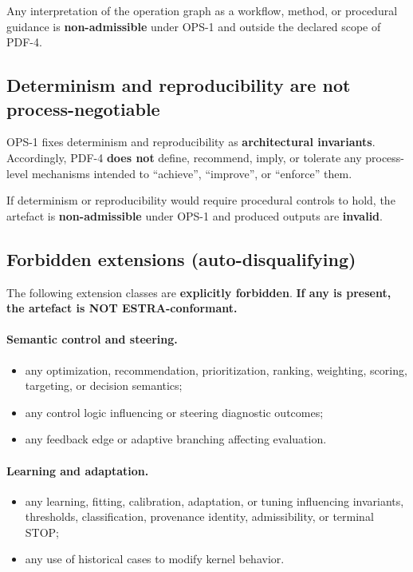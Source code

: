 Any interpretation of the operation graph
as a workflow, method,
or procedural guidance
is \textbf{non-admissible}
under OPS-1
and outside the declared
scope of PDF-4.

\subsection{Determinism and reproducibility are not process-negotiable}

OPS-1 fixes determinism
and reproducibility
as \textbf{architectural invariants}.
Accordingly, PDF-4 \textbf{does not}
define, recommend,
imply, or tolerate
any process-level mechanisms
intended to ``achieve'',
``improve'',
or ``enforce'' them.

If determinism or reproducibility
would require procedural controls
to hold,
the artefact is
\textbf{non-admissible}
under OPS-1
and produced outputs
are \textbf{invalid}.

\subsection{Forbidden extensions (auto-disqualifying)}

The following extension classes
are \textbf{explicitly forbidden}.
\textbf{If any is present,
the artefact is NOT ESTRA-conformant.}

\paragraph{Semantic control and steering.}
\begin{itemize}
  \item any optimization,
        recommendation,
        prioritization,
        ranking,
        weighting,
        scoring,
        targeting,
        or decision semantics;
  \item any control logic
        influencing or steering
        diagnostic outcomes;
  \item any feedback edge
        or adaptive branching
        affecting evaluation.
\end{itemize}

\paragraph{Learning and adaptation.}
\begin{itemize}
  \item any learning, fitting,
        calibration, adaptation,
        or tuning influencing
        invariants, thresholds,
        classification,
        provenance identity,
        admissibility,
        or terminal STOP;
  \item any use of historical cases
        to modify kernel behavior.
\end{itemize}

